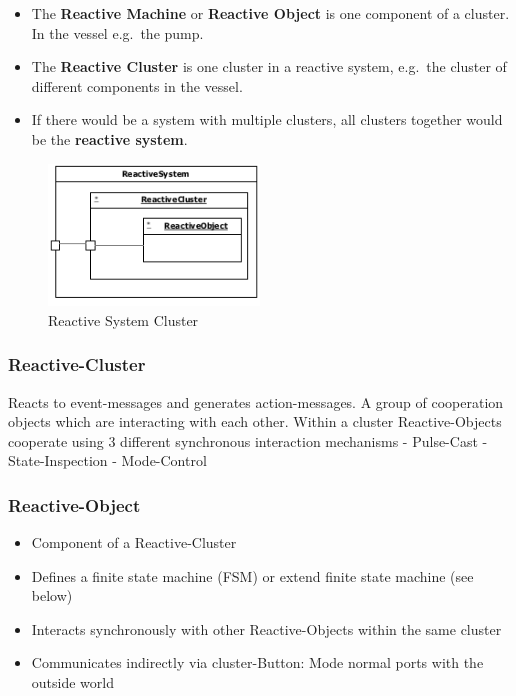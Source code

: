 \begin{itemize}
\tightlist
\item
  The \textbf{Reactive Machine} or \textbf{Reactive Object} is one
  component of a cluster. In the vessel e.g.~the pump.
\item
  The \textbf{Reactive Cluster} is one cluster in a reactive system,
  e.g.~the cluster of different components in the vessel.
\item
  If there would be a system with multiple clusters, all clusters
  together would be the \textbf{reactive system}.
\end{itemize}

\begin{figure}[H]
\centering
\includegraphics[width=0.5\textwidth]{figures/reactiveSystemCluster.png}
\caption{Reactive System Cluster}
\end{figure}

\hypertarget{reactive-cluster}{%
\subsubsection{Reactive-Cluster}\label{reactive-cluster}}

Reacts to event-messages and generates action-messages. A group of
cooperation objects which are interacting with each other. Within a
cluster Reactive-Objects cooperate using 3 different synchronous
interaction mechanisms - Pulse-Cast - State-Inspection - Mode-Control

\hypertarget{reactive-object}{%
\subsubsection{Reactive-Object}\label{reactive-object}}

\begin{itemize}
\tightlist
\item
  Component of a Reactive-Cluster
\item
  Defines a finite state machine (FSM) or extend finite state machine
  (see below)
\item
  Interacts synchronously with other Reactive-Objects within the same
  cluster
\item
  Communicates indirectly via cluster-Button: Mode normal ports with the
  outside world
\end{itemize}

